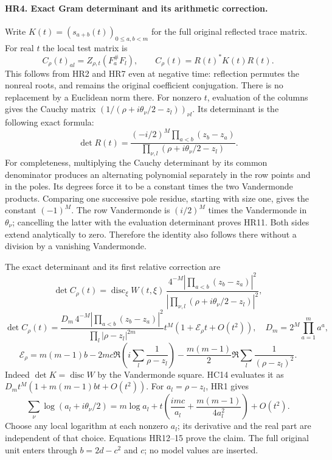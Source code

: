 \paragraph{HR4. Exact Gram determinant and its arithmetic correction.}
Write $K(t)=(s_{a+b}(t))_{0\le a,b<m}$ for the full original
reflected trace matrix. For real $t$ the local test matrix is
\[
 C_\rho(t)_{al}=Z_{\rho,t}(F_a^\#F_l),\qquad
 C_\rho(t)=R(t)^*K(t)R(t).
 \tag{HR10}
\]
This follows from HR2 and HR7 even at negative time: reflection
permutes the nonreal roots, and remains the original coefficient
conjugation. There is no replacement by a Euclidean norm there.
For nonzero $t$, evaluation of the columns gives the Cauchy matrix
$(1/(\rho+i\theta_\nu/2-z_l))_{\nu l}$. Its determinant is
the following exact formula:
\[
 \det R(t)=
 \frac{(-i/2)^M\prod_{a<b}(z_b-z_a)}
      {\prod_{\nu,l}(\rho+i\theta_\nu/2-z_l)}.
 \tag{HR11}
\]
For completeness, multiplying the Cauchy determinant by its common
denominator produces an alternating polynomial separately in
the row points and in the poles. Its degrees force it to be a
constant times the two Vandermonde products. Comparing one
successive pole residue, starting with size one, gives the
constant $(-1)^M$. The row Vandermonde is $(i/2)^M$ times
the Vandermonde in $\theta_\nu$; cancelling the latter with the
evaluation determinant proves HR11. Both sides extend analytically
to zero. Therefore the identity also follows there without a
division by a vanishing Vandermonde.

The exact determinant and its first relative correction are
\[
 \det C_\rho(t)=\operatorname{disc}_\xi W(t,\xi)\,
 \frac{4^{-M}|\prod_{a<b}(z_b-z_a)|^2}
      {|\prod_{\nu,l}(\rho+i\theta_\nu/2-z_l)|^2},
 \tag{HR12}
\]
\[
 \det C_\rho(t)=
 \frac{D_m\,4^{-M}|\prod_{a<b}(z_b-z_a)|^2}
      {\prod_l|\rho-z_l|^{2m}}
 t^M\left(1+\mathcal E_\rho t+O(t^2)\right),
 \quad D_m=2^M\prod_{a=1}^m a^a,
 \tag{HR13}
\]
\[
 \mathcal E_\rho=m(m-1)b
 -2mc\Re\left(i\sum_l\frac1{\rho-z_l}\right)
 -\frac{m(m-1)}2\Re\sum_l\frac1{(\rho-z_l)^2}.
 \tag{HR14}
\]
Indeed $\det K=\operatorname{disc}W$ by the Vandermonde square.
HC14 evaluates it as $D_mt^M(1+m(m-1)bt+O(t^2))$.
For $a_l=\rho-z_l$, HR1 gives
\[
 \sum_\nu\log(a_l+i\theta_\nu/2)
 =m\log a_l+t\left(\frac{imc}{a_l}
                  +\frac{m(m-1)}{4a_l^2}\right)+O(t^2).
 \tag{HR15}
\]
Choose any local logarithm at each nonzero $a_l$; its derivative
and the real part are independent of that choice. Equations
HR12--15 prove the claim. The full original unit enters through
$b=2d-c^2$ and $c$; no model values are inserted.

